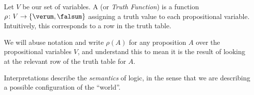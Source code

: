 \begin{node}\label{prop-0004}%
Let $V$ be our set of variables. A  (or
\textit{Truth Function}) is a function $\rho\colon V\to\{\verum,\falsum\}$
assigning a truth value to each propositional variable. Intuitively,
this corresponds to a row in the truth table.

We will abuse notation and write $\rho(A)$ for any proposition $A$ over
the propositional variables $V$, and understand this to mean it is the
result of looking at the relevant row of the truth table for $A$.

Interpretations describe the \emph{semantics} of logic, in the sense
that we are describing a possible configuration of the ``world''.
\end{node}
